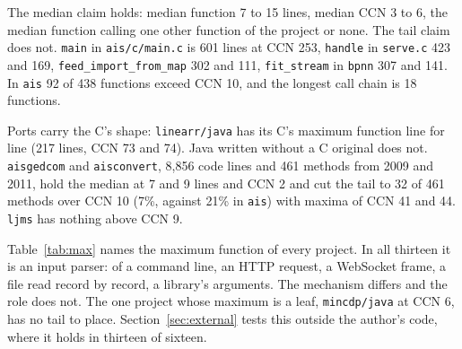 \documentclass[11pt,a4paper]{article}
\begin{document}
The median claim holds: median function 7 to 15 lines, median CCN 3 to 6, the median function calling one other function of the project or none. The tail claim does not. \texttt{main} in \texttt{ais/c/main.c} is 601 lines at CCN 253, \texttt{handle} in \texttt{serve.c} 423 and 169, \texttt{feed\_import\_from\_map} 302 and 111, \texttt{fit\_stream} in \texttt{bpnn} 307 and 141. In \texttt{ais} 92 of 438 functions exceed CCN 10, and the longest call chain is 18 functions.

Ports carry the C's shape: \texttt{linearr/java} has its C's maximum function line for line (217 lines, CCN 73 and 74). Java written without a C original does not. \texttt{aisgedcom} and \texttt{aisconvert}, 8,856 code lines and 461 methods from 2009 and 2011, hold the median at 7 and 9 lines and CCN 2 and cut the tail to 32 of 461 methods over CCN 10 (7\%, against 21\% in \texttt{ais}) with maxima of CCN 41 and 44. \texttt{ljms} has nothing above CCN 9.

Table~\ref{tab:max} names the maximum function of every project. In all thirteen it is an input parser: of a command line, an HTTP request, a WebSocket frame, a file read record by record, a library's arguments. The mechanism differs and the role does not. The one project whose maximum is a leaf, \texttt{mincdp/java} at CCN 6, has no tail to place. Section~\ref{sec:external} tests this outside the author's code, where it holds in thirteen of sixteen.
\end{document}
